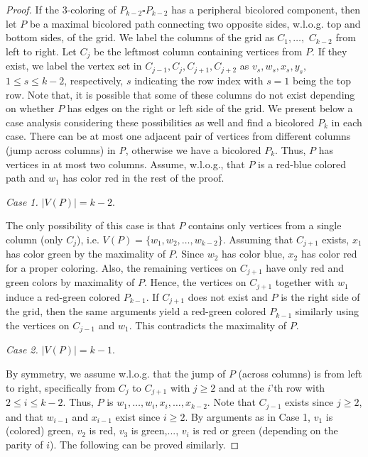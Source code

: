 \documentclass[10pt,a4paper]{amsart}
\begin{document}
\begin{proof}
If the 3-coloring of $P_{k-2}\square P_{k-2}$ has a peripheral bicolored component, then let $P$ be a maximal bicolored path connecting two opposite sides, w.l.o.g. top and bottom sides, of the grid. 
We label the columns of the grid as $C_1,\dots,$ $C_{k-2}$ from left to right. Let $C_j$ be the leftmost column containing vertices from $P$. 
If they exist, we label the vertex set in $C_{j-1}, C_j, C_{j+1}, C_{j+2}$ as $v_s, w_s, x_s, y_s,$ $1\leq s\leq k-2$, respectively, $s$ indicating the row index with $s=1$ being the top row. Note that, it is possible that some of these columns do not exist depending on whether $P$ has edges on the right or left side of the grid. We present below a case analysis considering these possibilities as well and find a bicolored $P_k$ in each case. There can be at most one adjacent pair of vertices from different columns (jump across columns) in {\it P}, otherwise we have a bicolored $P_k.$ Thus, $P$ has vertices in at most two columns. Assume, w.l.o.g., that $P$ is a red-blue colored path and $w_1$ has color red in the rest of the proof.  
 

\noindent
{\it Case 1.} $|V(P)|=k-2.$ 

The only possibility of this case is that $P$ contains only vertices from a single column (only $C_j$), i.e. $V(P)=\{w_1,w_2, \dots, w_{k-2}\}.$ Assuming that $C_{j+1}$ exists, $x_1$ has color green by the maximality of $P$. 
Since $w_2$ has color blue, $x_2$ has color red for a proper coloring. Also, the remaining vertices on $C_{j+1}$ have only red and green colors by maximality of $P$. Hence, the vertices on $C_{j+1}$ together with $w_1$ induce a red-green colored $P_{k-1}$. If $C_{j+1}$ does not exist and $P$ is the right side of the grid, then the same arguments yield a red-green colored $P_{k-1}$ similarly using the vertices on $C_{j-1}$ and $w_1.$ This contradicts the maximality of $P.$ 

\noindent
{\it Case 2.} $|V(P)|=k-1.$ 

By symmetry, we assume w.l.o.g. that the jump of $P$ (across columns) is from left to right, specifically from $C_j$ to $C_{j+1}$ with $j\geq 2$ and at the $i$'th row with $2\leq i\leq k-2.$ Thus, $P$ is $w_1, \dots, w_i, x_i, \dots, x_{k-2}.$ 
Note that $C_{j-1}$ exists since $j\geq 2$, and that $w_{i-1}$ and $x_{i-1}$ exist since $i\geq 2.$ By arguments as in Case 1, $v_1$ is (colored) green, $v_2$ is red, $v_3$ is green,..., $v_i$ is red or green (depending on the parity of $i$). The following can be proved similarly. 


\end{proof}
\end{document}
